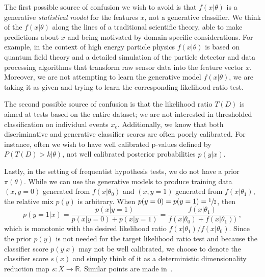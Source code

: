 \documentclass[11pt, oneside]{article}   	%
\begin{document}
The first possible source of confusion we wish to avoid is that  $f(x|\theta)$  is a generative \textit{statistical model} for the features $x$, not a generative classifier. We think of the  $f(x|\theta)$ along the lines of a traditional scientific theory, able to make predictions about $x$ and being motivated by domain-specific considerations. For example, in the context of high energy particle physics $f(x|\theta)$ is based on quantum field theory and a detailed simulation of the particle detector and data processing algorithms that transform raw sensor data into the feature vector $x$.  
Moreover, we are not attempting to learn the generative model $f(x|\theta)$, we are taking it as given and trying to learn the corresponding likelihood ratio test.

The second possible source of confusion is that the likelihood ratio $T(D)$ is aimed at tests based on the entire dataset; we are not interested in thresholded classification on individual events $x_e$.  
Additionally, we know that both discriminative and generative classifier scores are often poorly calibrated. 
For instance, often we wish to have well calibrated p-values defined by $P(T(D) > k |\theta)$, not well calibrated posterior probabilities $p(y|x)$.

Lastly, in the setting of frequentist hypothesis tests, we do not have a prior $\pi(\theta)$. 
While we can use the generative models to produce training data $(x,y=0)$ generated 
from $f(x|\theta_0)$ and $(x,y=1)$ generated from $f(x|\theta_1)$, the relative mix $p(y)$ 
is arbitrary.  When $p(y=0)=p(y=1)=\sfrac{1}{2}$, then 
\begin{equation}
p(y=1 | x) = \frac{p(x|y=1)}{p(x|y=0)+p(x|y=1)} = \frac{f(x|\theta_1)}{f(x|\theta_0)+f(x|\theta_1))} \;,
\end{equation}
which is monotonic with the desired likelihood ratio $f(x|\theta_1)/f(x|\theta_0)$.
Since the prior $p(y)$ is not needed for the target likelihood ratio test and because the classifier score $p(y|x)$ may not be well calibrated, we choose to denote the classifier score $s(x)$ and simply think of it as a deterministic dimensionality reduction map $s: X \to \mathbb{R}$.  Similar points are made in~\citep{ClaytonScott}.

\end{document}
